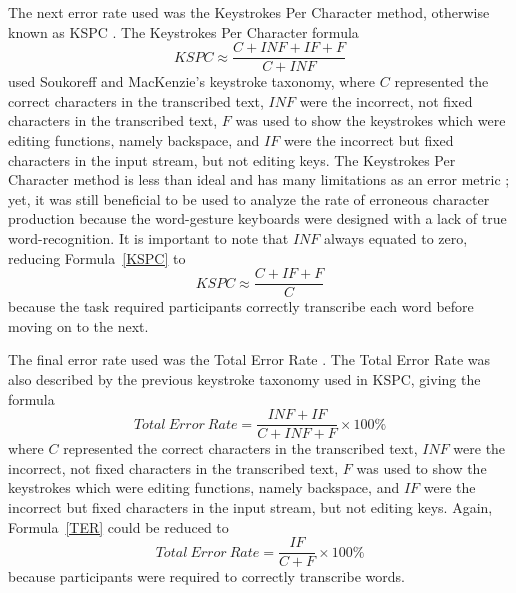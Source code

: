 The next error rate used was the Keystrokes Per Character method, otherwise known as KSPC \cite{ref_error_rates}. The Keystrokes Per Character formula
\begin{equation} \label{KSPC}
KSPC \approx \frac{C + INF + IF + F}{C + INF}
\end{equation}
used Soukoreff and MacKenzie's keystroke taxonomy, where $C$ represented the correct characters in the transcribed text, $INF$ were the incorrect, not fixed characters in the transcribed text, $F$ was used to show the keystrokes which were editing functions, namely backspace, and $IF$ were the incorrect but fixed characters in the input stream, but not editing keys. The Keystrokes Per Character method is less than ideal and has many limitations as an error metric \cite{ref_error_rates}; yet, it was still beneficial to be used to analyze the rate of erroneous character production because the word-gesture keyboards were designed with a lack of true word-recognition. It is important to note that $INF$ always equated to zero, reducing Formula~\ref{KSPC} to
\begin{equation} \label{KSPC_simple}
KSPC \approx \frac{C + IF + F}{C}
\end{equation}
because the task required participants correctly transcribe each word before moving on to the next.

The final error rate used was the Total Error Rate \cite{ref_error_rates}. The Total Error Rate was also described by the previous keystroke taxonomy used in KSPC, giving the formula
\begin{equation} \label{TER}{
	Total\ Error\ Rate = \frac{INF + IF}{C + INF + F} \times 100\%
}
\end{equation}
where $C$ represented the correct characters in the transcribed text, $INF$ were the incorrect, not fixed characters in the transcribed text, $F$ was used to show the keystrokes which were editing functions, namely backspace, and $IF$ were the incorrect but fixed characters in the input stream, but not editing keys. Again, Formula~\ref{TER} could be reduced to
\begin{equation} \label{TER_simple}
Total\ Error\ Rate = \frac{IF}{C + F} \times 100\%
\end{equation}
because participants were required to correctly transcribe words.

